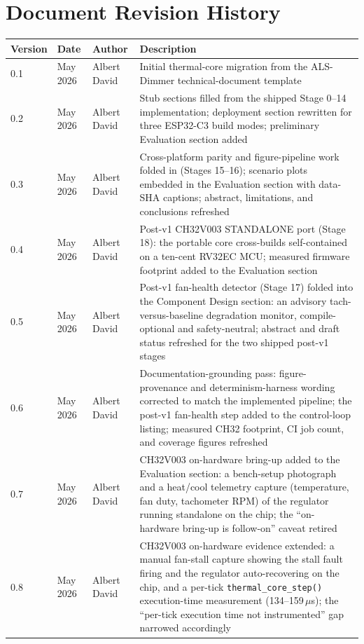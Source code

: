 \documentclass[11pt,a4paper]{article}
\begin{document}
\section*{Document Revision History}
\begin{longtable}{|p{}|p{}|p{}|p{}|}
    \hline
    \textbf{Version} & \textbf{Date} & \textbf{Author} & \textbf{Description} \\
    \hline
    0.1 & May 2026 & Albert David & Initial thermal-core migration from the ALS-Dimmer technical-document template \\
    \hline
    0.2 & May 2026 & Albert David & Stub sections filled from the shipped Stage 0--14 implementation; deployment section rewritten for three ESP32-C3 build modes; preliminary Evaluation section added \\
    \hline
    0.3 & May 2026 & Albert David & Cross-platform parity and figure-pipeline work folded in (Stages 15--16); scenario plots embedded in the Evaluation section with data-SHA captions; abstract, limitations, and conclusions refreshed \\
    \hline
    0.4 & May 2026 & Albert David & Post-v1 CH32V003 STANDALONE port (Stage 18): the portable core cross-builds self-contained on a ten-cent RV32EC MCU; measured firmware footprint added to the Evaluation section \\
    \hline
    0.5 & May 2026 & Albert David & Post-v1 fan-health detector (Stage 17) folded into the Component Design section: an advisory tach-versus-baseline degradation monitor, compile-optional and safety-neutral; abstract and draft status refreshed for the two shipped post-v1 stages \\
    \hline
    0.6 & May 2026 & Albert David & Documentation-grounding pass: figure-provenance and determinism-harness wording corrected to match the implemented pipeline; the post-v1 fan-health step added to the control-loop listing; measured CH32 footprint, CI job count, and coverage figures refreshed \\
    \hline
    0.7 & May 2026 & Albert David & CH32V003 on-hardware bring-up added to the Evaluation section: a bench-setup photograph and a heat/cool telemetry capture (temperature, fan duty, tachometer RPM) of the regulator running standalone on the chip; the ``on-hardware bring-up is follow-on'' caveat retired \\
    \hline
    0.8 & May 2026 & Albert David & CH32V003 on-hardware evidence extended: a manual fan-stall capture showing the stall fault firing and the regulator auto-recovering on the chip, and a per-tick \texttt{thermal\_core\_step()} execution-time measurement (134--159\,$\mu$s); the ``per-tick execution time not instrumented'' gap narrowed accordingly \\

\end{longtable}
\end{document}
